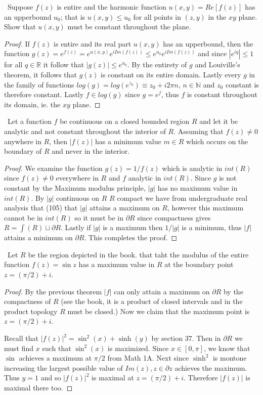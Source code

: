 \documentclass[11pt]{amsart}
\theoremstyle{definition}
\numberwithin{theorem}{section}
\numberwithin{definition}{section}
\numberwithin{equation}{section}
\begin{document}
\medskip {}\ Suppose $f(z)$ is entire and the harmonic function $u(x,y) = Re[f(z)]$ has
an upperbound $u_0$; that is $u(x,y) \leq u_0$ for all points in $(z,y)$ in the $xy$ plane. Show 
that $u(x,y)$ must be constant throughout the plane.
\begin{proof}
	If $f(z)$ is entire and its real part $u(x,y)$ has an upperbound, then the function $g(z) = e^{f(z)} = e^{u(x,y)}e^{i Im(f(z))} \leq e^{u_0} e^{i Im(f(z))}$ and since $|e^{i q}| \leq 1$ for all $q \in \mathbb{R}$ it follow that
	$|g(z)| \leq e^{u_0}.$ By the entirety of $g$ and Louiville's theorem, it follows that $g(z)$ is constant on its entire domain. Lastly every $g$ in the family of functions $log(g) = log(e^{z_0}) \equiv z_0 + i2\pi n$, $n \in \mathbb{N}$ and $z_0$ constant is therefore constant. Lastly $f \in log(g)$ since $g = e^f$, thus $f$ is constant throughout its domain, ie. the $xy$ plane.
\end{proof}

\medskip {}\ Let a function $f$ be continuous on a closed bounded region $R$ and let it be analytic and not constant throughout the interior of $R$. Assuming that $f(z) \neq 0$ anywhere in $R$, then $|f(z)|$ has a minimum value $m \in R$ which occurs on the boundary of $R$ and never in the interior.
\begin{proof}
 	We examine the function $g(z) = 1/f(z)$ which is analytic in $int(R)$ since $f(z) \neq 0$ everywhere in $R$ and $f$ analytic in $int(R)$. Since 
 	$g$ is not constant by the Maximum modulus principle, $|g|$ has no maximum value in $int(R)$. By $|g|$ continuous on $R$ $R$ compact we have from undergraduate real analysis that (105) that $|g|$ attains a maximum on $R$, however this maximum cannot be in $int(R)$ so it must be in $\partial R$ since compactness gives $R = \int(R) \sqcup \partial R.$ Lastly if $|g|$ is a maximum then $1/|g|$ is a minimum, thus $|f|$ attains a minimum on $\partial R$. This completes the proof.
 \end{proof} 


\medskip {}\ Let $R$ be the region depicted in the book. that taht the modulus of the entire function $f(z) = \sin z$ has a maximum value in $R$ at the boundary point $z = (\pi/2) + i$.
\begin{proof}
 	By the previous theorem $|f|$ can only attain a maximum on $\partial R$ by the compactness of $R$ (see the book, it is a product of closed intervals and in the product topology $R$ must be closed.) Now we claim that the maximum point is $z = (\pi/2) + i$.

 	Recall that $|f(z)|^2 = \sin^2(x) + \sinh(y)$ by section 37. Then in $\partial R$ we must find $x$ such that $\sin^2(x)$ is maximized. Since $x \in [0, \pi]$, we know that $\sin$ achieves a maximum at $\pi/2$ from Math 1A. Next since $\sinh^2$ is montone increasing the largest possible value of $Im(z), z \in \partial z$  achieves the maximum. Thus $y = 1$ and so $|f(z)|^2$ is maximal at $z = (\pi/2) + i$. Therefore $|f(z)|$ is maximal there too.
 \end{proof} 
\end{document}
